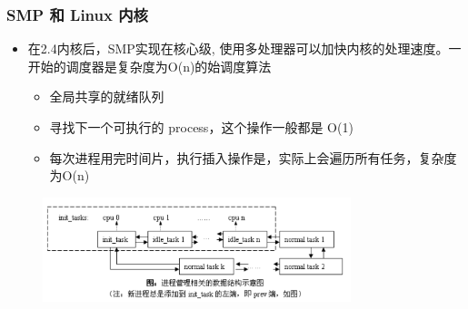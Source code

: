 \begin{frame}
	\frametitle{SMP 和 Linux 内核}

	\begin{itemize}
	
	\item 在2.4内核后，SMP实现在核心级, 使用多处理器可以加快内核的处理速度。一开始的调度器是复杂度为O(n)的始调度算法
	
		\begin{itemize}
		\item 全局共享的就绪队列
		\item 寻找下一个可执行的 process，这个操作一般都是 O(1)
		\item 每次进程用完时间片，执行插入操作是，实际上会遍历所有任务，复杂度为O(n)

		\end{itemize}
	\end{itemize}
	
    \begin{figure}
	\includegraphics[width=0.8\textwidth,natwidth=1011,natheight=343]{figs/linux-2.4-sched.png}
    \end{figure}


\end{frame}


